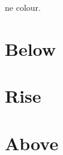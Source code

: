 \documentclass[10pt,a4paper]{article}
\begin{document}
ne colour. \lipsum[1]
\section{Below}\lipsum[2-6]
\section{Rise}\lipsum[7-13]
\limenrule
\section{Above}\lipsum[14-22]
\end{document}
